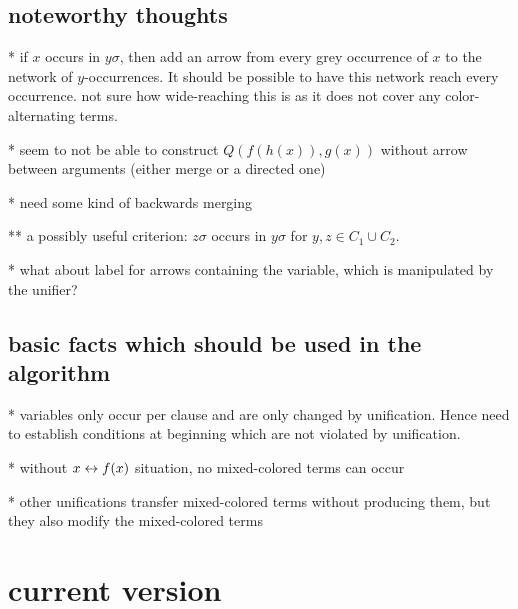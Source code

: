 \documentclass[,%
	paper=a4,%
	DIV9, %
	twoside=false,%
	liststotoc,
	bibtotoc,
	draft=false,%
	numbers=noendperiod
]{scrartcl}
\begin{document}
\newcommand{\substremarksym}{$\ast$}
\newcommand{\substremarkref}{$(\ast)$}

\newcommand{\lif}[1]{\lift{\Delta}{#1}{x}}
\newcommand{\newterm}{^*}
\newcommand{\de}{^\Delta}


\subsection*{noteworthy thoughts}

{\large

* if $x$ occurs in $y\sigma$, then add an arrow from every grey occurrence of $x$ to the network of $y$-occurrences. It should be possible to have this network reach every occurrence. not sure how wide-reaching this is as it does not cover any color-alternating terms.

}
* seem to not be able to construct $Q(f(h(x)), g(x))$ without arrow between arguments (either merge or a directed one) 

* need some kind of backwards merging

** a possibly useful criterion: $z\sigma$ occurs in $y\sigma$ for $y, z \in C_1 \cup C_2$.

* what about label for arrows containing the variable, which is manipulated by the unifier?

\subsection*{basic facts which should be used in the algorithm}

* variables only occur per clause and are only changed by unification. Hence need to establish conditions at beginning which are not violated by unification.

* without $x \leftrightarrow f(x)$ situation, no mixed-colored terms can occur

* other unifications transfer mixed-colored terms without producing them, but they also modify the mixed-colored terms




\section{current version}



\end{document}
